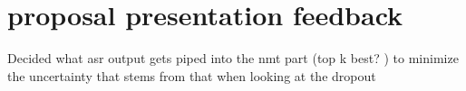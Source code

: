 \section{proposal presentation feedback}
Decided what asr output gets piped into the nmt part (top k best? ) to minimize the uncertainty that stems from that when looking at the dropout